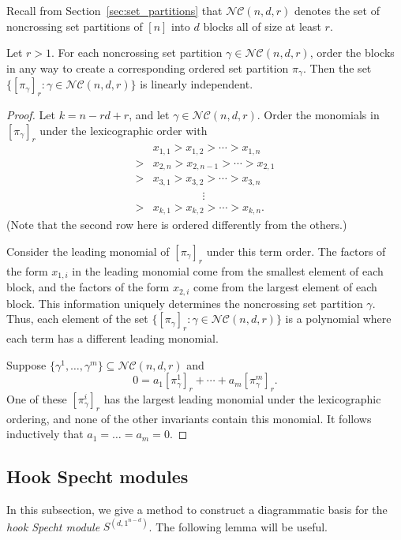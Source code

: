 \documentclass[ALCO, Unicode]{cedram}
\numberwithin{equation}{section}
\newcommand{\nc}{\mathcal{NC}}
\begin{document}
Recall from Section~\ref{sec:set_partitions} that $\nc(n,d,r)$ denotes the set of noncrossing set partitions of $[n]$ into $d$ blocks all of size at least $r$.

\begin{theorem}\label{thm:linind}
Let $r> 1$. For each noncrossing set partition $\gamma \in \nc(n,d,r)$, order the blocks in any way to create a corresponding ordered set partition $\pi_\gamma$. Then the set $\{ [\pi_\gamma]_r : \gamma \in \nc(n,d,r) \}$ is linearly independent.
\end{theorem}
\begin{proof}
Let $k = n - r d + r$, and let $\gamma\in\nc(n,d,r)$. Order the monomials in $[\pi_\gamma]_r$ under the lexicographic order with 
\begin{align*} &x_{1,1} > x_{1,2} > \cdots > x_{1,n}  \\
> &x_{2,n} > x_{2,n-1} > \cdots >x_{2,1}\\
> &x_{3,1}>x_{3,2} >\cdots>x_{3,n}\\
&\phantom{asasdfdsf} \vdots\\
> &x_{k,1}>x_{k,2} >\cdots > x_{k,n}.
\end{align*}
(Note that the second row here is ordered differently from the others.)

Consider the leading monomial of $[\pi_\gamma]_r$ under this term order. The factors of the form $x_{1,i}$ in the leading monomial come from the smallest element of each block, and the factors of the form $x_{2,i}$ come from the largest element of each block. This information uniquely determines the noncrossing set partition $\gamma$.
Thus, each element of the set $\{ [\pi_\gamma]_r : \gamma \in \nc(n,d,r) \}$ is a polynomial where each term has a different leading monomial. 

Suppose $\{\gamma^1,\ldots,\gamma^m\}\subseteq \nc(n,d,r)$ and \[0=a_1[\pi_\gamma^1]_r+\cdots+a_m[\pi_\gamma^m]_r.\]
One of these $[\pi_\gamma^i]_r$ has the largest leading monomial under the lexicographic ordering, and none of the other invariants contain this monomial. It follows inductively that $a_1=\dots=a_m=0$.
\end{proof}

\subsection{Hook Specht modules}\label{sec:hook}

In this subsection, we give a method to construct a diagrammatic basis for the \emph{hook Specht module} $S^{(d,1^{n-d})}$. The following lemma will be useful.
\end{document}

